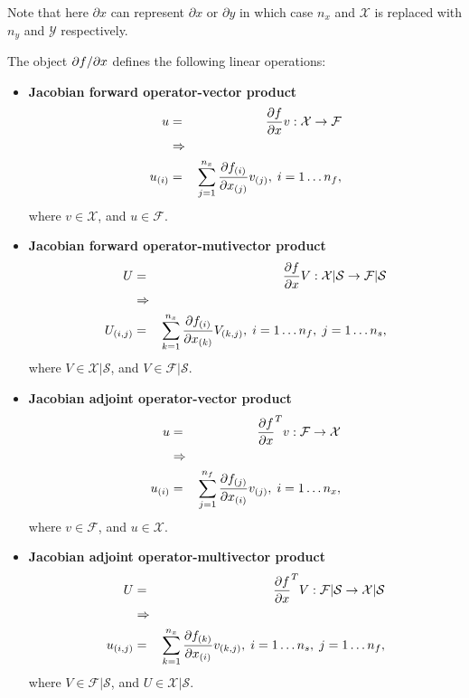 \documentclass[pdf,ps2pdf,11pt]{SANDreport}
\begin{document}
Note that here $\partial x$ can represent $\partial x$ or $\partial y$ in
which case $n_x$ and $\mathcal{X}$ is replaced with $n_y$ and $\mathcal{Y}$
respectively.

The object $\partial f / \partial x$ defines the following linear operations:
%
\begin{itemize}
%
{}\item \textbf{Jacobian forward operator-vector product}
%
\begin{eqnarray*}
u & = & \displaystyle{\frac{\partial f}{\partial x}} v : \mathcal{X} \rightarrow \mathcal{F} \\
& \Rightarrow & \\
u_{(i)} & = & \sum_{j=1}^{n_x} \displaystyle{\frac{\partial f_{(i)}}{\partial x_{(j)}}} v_{(j)}, \; i = 1 \ldots n_f,
\end{eqnarray*}
%
where $v\in\mathcal{X}$, and $u\in\mathcal{F}$.
%
{}\item \textbf{Jacobian forward operator-mutivector product}
%
\begin{eqnarray*}
U & = & \displaystyle{\frac{\partial f}{\partial x}} V : \mathcal{X}|\mathcal{S} \rightarrow \mathcal{F}|\mathcal{S} \\
& \Rightarrow & \\
U_{(i,j)} & = & \sum_{k=1}^{n_x} \displaystyle{\frac{\partial f_{(i)}}{\partial x_{(k)}}} V_{(k,j)}, \; i = 1 \ldots n_f, \; j = 1 \ldots n_s,
\end{eqnarray*}
%
where $V\in\mathcal{X}|\mathcal{S}$, and $V\in\mathcal{F}|\mathcal{S}$.
%
{}\item\textbf{Jacobian adjoint operator-vector product}
%
\begin{eqnarray*}
u & = & \displaystyle{\frac{\partial f}{\partial x}}^T v : \mathcal{F} \rightarrow \mathcal{X} \\
& \Rightarrow & \\
u_{(i)} & = & \sum_{j=1}^{n_f} \displaystyle{\frac{\partial f_{(j)}}{\partial x_{(i)}}} v_{(j)}, \; i = 1 \ldots n_x,
\end{eqnarray*}
%
where $v\in\mathcal{F}$, and $u\in\mathcal{X}$.
%
{}\item\textbf{Jacobian adjoint operator-multivector product}
%
\begin{eqnarray*}
U & = & \displaystyle{\frac{\partial f}{\partial x}}^T V : \mathcal{F}|\mathcal{S} \rightarrow \mathcal{X}|\mathcal{S} \\
& \Rightarrow & \\
u_{(i,j)} & = & \sum_{k=1}^{n_x} \displaystyle{\frac{\partial f_{(k)}}{\partial x_{(i)}}} v_{(k,j)}, \; i = 1 \ldots n_s, \; j = 1 \ldots n_f,
\end{eqnarray*}
%
where $V\in\mathcal{F}|\mathcal{S}$, and $U\in\mathcal{X}|\mathcal{S}$.
%
\end{itemize}
\end{document}
